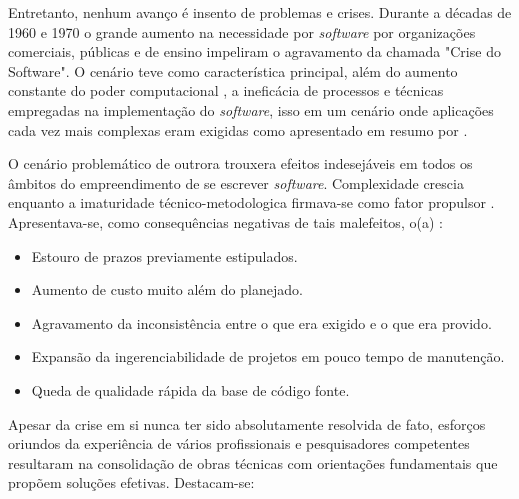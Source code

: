     Entretanto, nenhum avanço é insento de problemas e crises. Durante a décadas de 1960 e
    1970 o grande aumento na necessidade por \textit{software} por organizações comerciais,
    públicas e de ensino impeliram o agravamento da chamada "Crise do Software".
    O cenário teve como característica principal, além do aumento constante do poder
    computacional \cite[~p.3]{dijkstra1972humble}, a ineficácia de processos e técnicas
    empregadas na implementação do \textit{software}, isso em um cenário onde aplicações cada vez
    mais complexas eram exigidas como apresentado em resumo por
    \cite{softwareCrisis2}.

 
    O cenário problemático de outrora trouxera efeitos indesejáveis em todos os âmbitos
    do empreendimento de se escrever \textit{software}. Complexidade crescia enquanto
    a imaturidade técnico-metodologica firmava-se como fator propulsor \cite[~p.14]{brooks1995mythical}. Apresentava-se,
    como consequências negativas de tais malefeitos, o(a) :

    \begin{itemize}
      \item{ Estouro de prazos previamente estipulados. }
      \item{ Aumento de custo muito além do planejado. }
      \item{ Agravamento da inconsistência entre o que era exigido e o que era provido. }
      \item{ Expansão da ingerenciabilidade de projetos em pouco tempo de manutenção. }
      \item{ Queda de qualidade rápida da base de código fonte. }
    \end{itemize}

    Apesar da crise em si nunca ter sido absolutamente resolvida de fato, esforços
    oriundos da experiência de vários profissionais e pesquisadores competentes
    resultaram na consolidação de obras técnicas com orientações fundamentais que
    propõem soluções efetivas. Destacam-se: 

